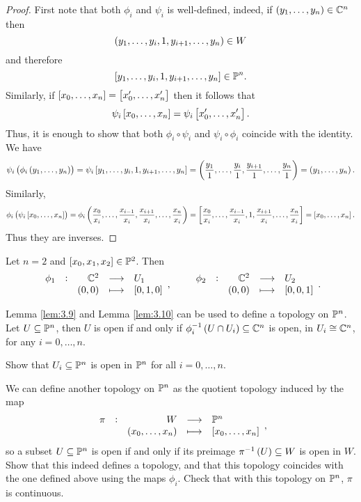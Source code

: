 \begin{proof}
First note that both $ \phi_i $ and $ \psi_i $ is well-defined, indeed, if $ \br{y_1, \dots, y_n} \in \CC^n $ then
$$ \br{y_1, \dots, y_i, 1, y_{i + 1}, \dots, y_n} \in W $$
and therefore
$$ \sbr{y_1, \dots, y_i, 1, y_{i + 1}, \dots, y_n} \in \PP^n. $$
Similarly, if $ \sbr{x_0, \dots, x_n} = \sbr{x_0', \dots, x_n'} $ then it follows that
$$ \psi_i\sbr{x_0, \dots, x_n} = \psi_i\sbr{x_0', \dots, x_n'}. $$
Thus, it is enough to show that both $ \phi_i \circ \psi_i $ and $ \psi_i \circ \phi_i $ coincide with the identity. We have
$$ \psi_i\br{\phi_i\br{y_1, \dots, y_n}} = \psi_i\sbr{y_1, \dots, y_i, 1, y_{i + 1}, \dots, y_n} = \br{\dfrac{y_1}{1}, \dots, \dfrac{y_i}{1}, \dfrac{y_{i + 1}}{1}, \dots, \dfrac{y_n}{1}} = \br{y_1, \dots, y_n}. $$
Similarly,
$$ \phi_i\br{\psi_i\sbr{x_0, \dots, x_n}} = \phi_i\br{\dfrac{x_0}{x_i}, \dots, \dfrac{x_{i - 1}}{x_i}, \dfrac{x_{i + 1}}{x_i}, \dots, \dfrac{x_n}{x_i}} = \sbr{\dfrac{x_0}{x_i}, \dots, \dfrac{x_{i - 1}}{x_i}, 1, \dfrac{x_{i + 1}}{x_i}, \dots, \dfrac{x_n}{x_i}} = \sbr{x_0, \dots, x_n}. $$
Thus they are inverses.
\end{proof}

\begin{example*}
Let $ n = 2 $ and $ \sbr{x_0, x_1, x_2} \in \PP^2 $. Then
$$ \function[\phi_1]{\CC^2}{U_1}{\br{0, 0}}{\sbr{0, 1, 0}}, \qquad \function[\phi_2]{\CC^2}{U_2}{\br{0, 0}}{\sbr{0, 0, 1}}. $$
\end{example*}

Lemma \ref{lem:3.9} and Lemma \ref{lem:3.10} can be used to define a topology on $ \mathbb{P}^n $. Let $ U \subseteq \mathbb{P}^n $, then $ U $ is open if and only if $ \phi_i^{-1}\br{U \cap U_i} \subseteq \CC^n $ is open, in $ U_i \cong \mathbb{C}^n $, for any $ i = 0, \dots, n $.

\begin{exercise**}
Show that $ U_i \subseteq \mathbb{P}^n $ is open in $ \mathbb{P}^n $ for all $ i = 0, \dots, n $.
\end{exercise**}

\begin{exercise**}
\label{ex:11}
We can define another topology on $ \mathbb{P}^n $ as the quotient topology induced by the map
$$ \function[\pi]{W}{\PP^n}{\br{x_0, \dots, x_n}}{\sbr{x_0, \dots, x_n}}, $$
so a subset $ U \subseteq \mathbb{P}^n $ is open if and only if its preimage $ \pi^{-1}\br{U} \subseteq W $ is open in $ W $. Show that this indeed defines a topology, and that this topology coincides with the one defined above using the maps $ \phi_i $. Check that with this topology on $ \mathbb{P}^n $, $ \pi $ is continuous.
\end{exercise**}


